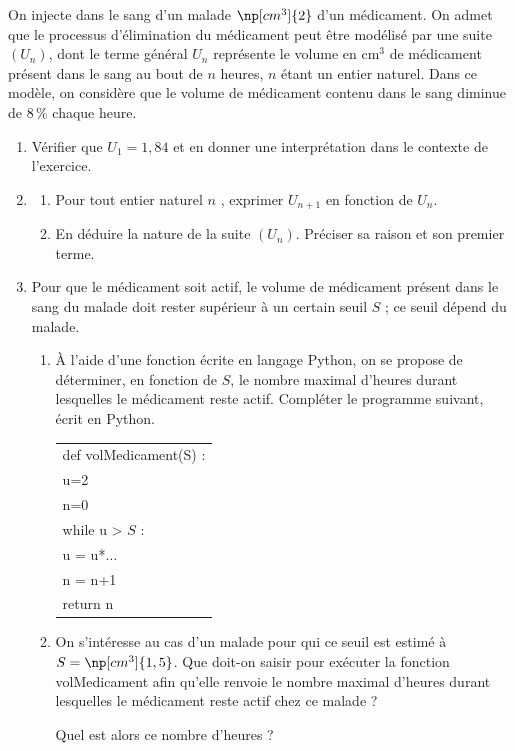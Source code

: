 \medskip

On injecte dans le sang d'un malade $\np[cm^3]{2}$  d'un médicament. On admet que le processus
d'élimination du médicament peut être modélisé par une suite $\left(U_n\right)$, dont le terme général $U_n$ représente le volume en cm$^3$ de médicament présent dans le sang au bout de $n$ heures,
$n$ étant un entier naturel. Dans ce modèle, on considère que le volume de médicament
contenu dans le sang diminue de 8\,\% chaque heure.

\medskip

\begin{enumerate}
\item Vérifier que $U_1 = 1,84$ et en donner une interprétation dans le contexte de l'exercice.
\item 
	\begin{enumerate}
		\item Pour tout entier naturel $n$ , exprimer $U_{n+1}$ en fonction de $U_n$.

		\item En déduire la nature de la suite $\left(U_n\right)$. Préciser sa raison et son premier terme.

	\end{enumerate}
\item Pour que le médicament soit actif, le volume de médicament présent dans le sang du malade doit rester supérieur à un certain seuil $S$ ; ce seuil dépend du malade.
	\begin{enumerate}
		\item À l'aide d'une fonction écrite en langage Python, on se propose de déterminer, en fonction de $S$, le nombre maximal d'heures durant lesquelles le médicament reste actif.
Compléter le programme suivant, écrit en Python.

\begin{center}
\begin{tabular}{|l|}
\hline
def volMedicament(S) :\\
\hspace{2em}u=2\\
\hspace{2em}n=0\\
\hspace{2em}while u > $S$ :\\
\hspace{2em}	u = u*$\dots$\\
\hspace{2em}	n = n+1\\
return n\\\hline
\end{tabular}
\end{center}

		\item On s'intéresse au cas d'un malade pour qui ce seuil est estimé à $S = \np[cm^3]{1,5}$.
Que doit-on saisir pour exécuter la fonction volMedicament afin qu'elle renvoie 
le nombre maximal d'heures durant lesquelles le médicament reste actif chez ce malade ?


Quel est alors ce nombre d'heures ?

	\end{enumerate}
\end{enumerate}

\vspace{0,5cm}
